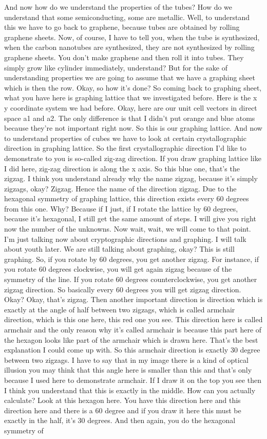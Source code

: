 And now how do we understand the properties of the tubes? How do we understand that some semiconducting, some are metallic. Well, to understand this we have to go back to graphene, because tubes are obtained by rolling graphene sheets. Now, of course, I have to tell you, when the tube is synthesized, when the carbon nanotubes are synthesized, they are not synthesized by rolling graphene sheets. You don't make graphene and then roll it into tubes. They simply grow like cylinder immediately, understand? But for the sake of understanding properties we are going to assume that we have a graphing sheet which is then the row. Okay, so how it's done? So coming back to graphing sheet, what you have here is graphing lattice that we investigated before. Here is the x y coordinate system we had before. Okay, here are our unit cell vectors in direct space a1 and a2. The only difference is that I didn't put orange and blue atoms because they're not important right now. So this is our graphing lattice. And now to understand properties of cubes we have to look at certain crystallographic direction in graphing lattice. So the first crystallographic direction I'd like to demonstrate to you is so-called zig-zag direction. If you draw graphing lattice like I did here, zig-zag direction is along the x axis. So this blue one, that's the zigzag. I think you understand already why the name zigzag, because it's simply zigzags, okay? Zigzag. Hence the name of the direction zigzag. Due to the hexagonal symmetry of graphing lattice, this direction exists every 60 degrees from this one. Why? Because if I just, if I rotate the lattice by 60 degrees, because it's hexagonal, I still get the same amount of steps. I will give you right now the number of the unknowns. Now wait, wait, we will come to that point. I'm just talking now about cryptographic directions and graphing. I will talk about youth later. We are still talking about graphing, okay? This is still graphing. So, if you rotate by 60 degrees, you get another zigzag. For instance, if you rotate 60 degrees clockwise, you will get again zigzag because of the symmetry of the line. If you rotate 60 degrees counterclockwise, you get another zigzag direction. So basically every 60 degrees you will get zigzag direction. Okay? Okay, that's zigzag. Then another important direction is direction which is exactly at the angle of half between two zigzags, which is called armchair direction, which is this one here, this red one you see. This direction here is called armchair and the only reason why it's called armchair is because this part here of the hexagon looks like part of the armchair which is drawn here. That's the best explanation I could come up with. So this armchair direction is exactly 30 degree between two zigzags. I have to say that in my image there is a kind of optical illusion you may think that this angle here is smaller than this and that's only because I used here to demonstrate armchair. If I draw it on the top you see then I think you understand that this is exactly in the middle. How can you actually calculate? Look at this hexagon here. You have this direction here and this direction here and there is a 60 degree and if you draw it here this must be exactly in the half, it's 30 degrees. And then again, you do the hexagonal symmetry of 